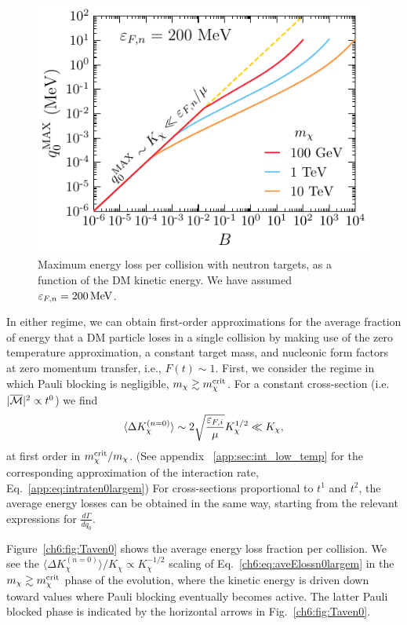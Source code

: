 \begin{figure}[t!bp]
  \centering
  \includegraphics{q0max_Tdm.pdf}
  \caption{Maximum energy loss per collision with neutron targets, as a function of the DM kinetic energy. We have assumed $\varepsilon_{F,n}=200{\rm \,MeV}$.} 
  \label{ch6:fig:q0max}
\end{figure}



In either regime, we can obtain first-order approximations for the average fraction of energy that a DM particle loses in a single collision by making use of the zero temperature approximation, a constant target mass, and nucleonic form factors at zero momentum transfer, i.e., $F(t)\sim1$. 
First, we consider the regime in which Pauli blocking is negligible, $m_\chi \gtrsim m_\chi^{\rm crit}$. For a constant cross-section (i.e. $|\overline{\mathcal M}|^2 \propto t^0$) we find 
\begin{equation}
  \langle \Delta K_\chi^{(n=0)} \rangle 
  \sim 2 \sqrt{\frac{\varepsilon_{F,i}}{\mu}} K_\chi^{1/2} \ll K_\chi, 
\label{ch6:eq:aveElossn0largem}
\end{equation}
at first order in $m_\chi^{\rm crit}/m_\chi$. (See appendix ~\ref{app:sec:int_low_temp} for the corresponding approximation of the interaction rate, Eq.~\ref{app:eq:intraten0largem}) For cross-sections proportional to $t^1$ and $t^2$, the average energy losses can be obtained in the same way, starting from the relevant expressions for  $\frac{d\Gamma}{d q_0}$.

Figure~\ref{ch6:fig:Taven0} shows the average energy loss fraction per collision. We see the  $\langle \Delta K_\chi^{(n=0)} \rangle/K_\chi \propto K_\chi^{-1/2}$ scaling of Eq.~\ref{ch6:eq:aveElossn0largem}
in the $m_\chi \gtrsim m_\chi^{\rm crit}$ phase of the evolution, where the kinetic energy is driven down toward values where Pauli blocking eventually becomes active. The latter Pauli blocked phase is indicated by the horizontal arrows in Fig.~\ref{ch6:fig:Taven0}. 





